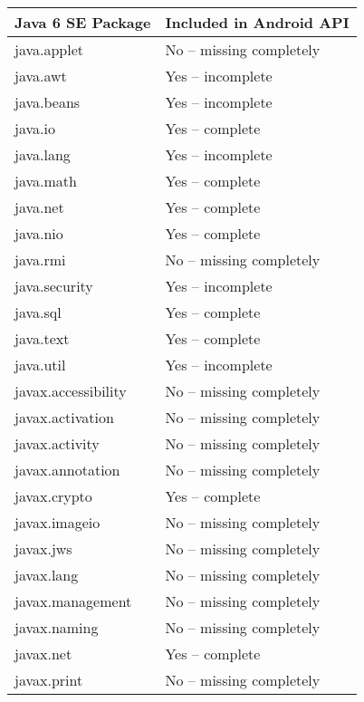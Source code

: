 \begin {table}[h!]
\begin{tabular}{|l|l|}
\hline
{\bf Java 6 SE Package} & {\bf Included in Android API} \\
\hline \hline
java.applet             & No -- missing completely    \\
java.awt                & Yes -- incomplete            \\
java.beans              & Yes -- incomplete            \\
java.io	                & Yes -- complete            \\
java.lang	            & Yes -- incomplete            \\
java.math	            & Yes -- complete            \\
java.net	            & Yes -- complete             \\
java.nio	            & Yes -- complete             \\
java.rmi	            & No  -- missing completely    \\
java.security	        & Yes -- incomplete            \\
java.sql	            & Yes -- complete            \\
java.text	            & Yes -- complete              \\
java.util	            & Yes -- incomplete            \\
javax.accessibility     & No -- missing completely    \\
javax.activation	    & No -- missing completely    \\
javax.activity	        & No -- missing completely    \\
javax.annotation	    & No -- missing completely    \\
javax.crypto	        & Yes -- complete              \\
javax.imageio	        & No -- missing completely    \\
javax.jws	            & No -- missing completely    \\
javax.lang	            & No -- missing completely    \\
javax.management        & No -- missing completely    \\
javax.naming	        & No -- missing completely    \\
javax.net	            & Yes -- complete              \\
javax.print		        & No -- missing completely    \\

\end{tabular}
\end{table}
